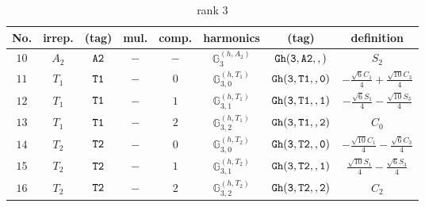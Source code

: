 \documentclass[fleqn,8pt]{jsarticle}
\begin{document}
\begin{table}[ht!]
\begin{center}
\caption{rank 3}
\renewcommand{\arraystretch}{1.3}
\begin{tabular}{cccccccc} \hline \hline
No. & irrep. & (tag) & mul. & comp. & harmonics & (tag) & definition \\ \hline
$ 10 $ & $ A_{2} $ & $ {\tt A2} $ & $ - $ & $ - $ & $ \mathbb{G}_{3}^{(h,A_{2})} $ & $ {\tt Gh(3,A2,,)} $ & $ S_{2} $ \\
$ 11 $ & $ T_{1} $ & $ {\tt T1} $ & $ - $ & $ 0 $ & $ \mathbb{G}_{3,0}^{(h,T_{1})} $ & $ {\tt Gh(3,T1,,0)} $ & $ - \frac{\sqrt{6} C_{1}}{4} + \frac{\sqrt{10} C_{3}}{4} $ \\
$ 12 $ & $ T_{1} $ & $ {\tt T1} $ & $ - $ & $ 1 $ & $ \mathbb{G}_{3,1}^{(h,T_{1})} $ & $ {\tt Gh(3,T1,,1)} $ & $ - \frac{\sqrt{6} S_{1}}{4} - \frac{\sqrt{10} S_{3}}{4} $ \\
$ 13 $ & $ T_{1} $ & $ {\tt T1} $ & $ - $ & $ 2 $ & $ \mathbb{G}_{3,2}^{(h,T_{1})} $ & $ {\tt Gh(3,T1,,2)} $ & $ C_{0} $ \\
$ 14 $ & $ T_{2} $ & $ {\tt T2} $ & $ - $ & $ 0 $ & $ \mathbb{G}_{3,0}^{(h,T_{2})} $ & $ {\tt Gh(3,T2,,0)} $ & $ - \frac{\sqrt{10} C_{1}}{4} - \frac{\sqrt{6} C_{3}}{4} $ \\
$ 15 $ & $ T_{2} $ & $ {\tt T2} $ & $ - $ & $ 1 $ & $ \mathbb{G}_{3,1}^{(h,T_{2})} $ & $ {\tt Gh(3,T2,,1)} $ & $ \frac{\sqrt{10} S_{1}}{4} - \frac{\sqrt{6} S_{3}}{4} $ \\
$ 16 $ & $ T_{2} $ & $ {\tt T2} $ & $ - $ & $ 2 $ & $ \mathbb{G}_{3,2}^{(h,T_{2})} $ & $ {\tt Gh(3,T2,,2)} $ & $ C_{2} $ \\
 \hline \hline
\end{tabular}
\end{center}
\end{table}
\end{document}
